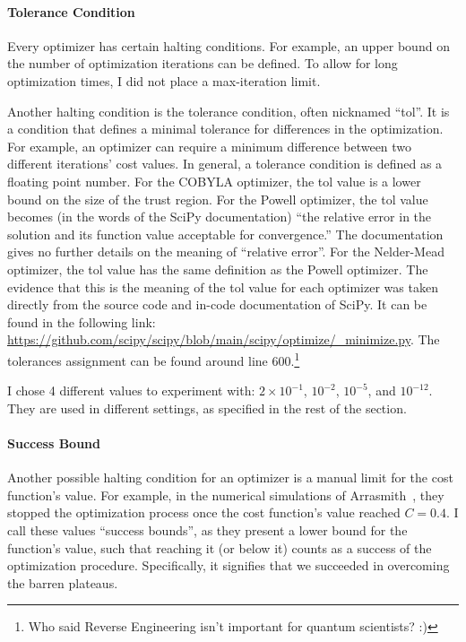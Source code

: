 \documentclass[a4paper,12pt]{article}
\newcommand{\e}[1]{ 10^{#1}}
\begin{document}
\paragraph*{Tolerance Condition}
Every optimizer has certain halting conditions.
For example, an upper bound on the number of optimization iterations can be defined.
To allow for long optimization times, I did not place a max-iteration limit.

Another halting condition is the tolerance condition, often nicknamed ``tol''.
It is a condition that defines a minimal tolerance for differences in the optimization.
For example, an optimizer can require a minimum difference between two different iterations' cost values.
In general, a tolerance condition is defined as a floating point number.
For the COBYLA optimizer, the tol value is a lower bound on the size of the trust region.
For the Powell optimizer, the tol value becomes (in the words of the SciPy documentation) ``the relative error in the solution and its function value acceptable for convergence.'' The documentation gives no further details on the meaning of ``relative error''.
For the Nelder-Mead optimizer, the tol value has the same definition as the Powell optimizer.
The evidence that this is the meaning of the tol value for each optimizer was taken directly from the source code and in-code documentation of SciPy.
It can be found in the following link: \url{https://github.com/scipy/scipy/blob/main/scipy/optimize/_minimize.py}. The tolerances assignment can be found around line 600.\footnote{Who said Reverse Engineering isn't important for quantum scientists? :)}

I chose 4 different values to experiment with: $2 \times \e{-1}$, $\e{-2}$, $\e{-5}$, and $\e{-12}$. They are used in different settings, as specified in the rest of the section.

\paragraph*{Success Bound}
Another possible halting condition for an optimizer is a manual limit for the cost function's value.
For example, in the numerical simulations of Arrasmith~\cite{arrasmith_effect_2021}, they stopped the optimization process once the cost function's value reached $C=0.4$.
I call these values ``success bounds'', as they present a lower bound for the function's value, such that reaching it (or below it) counts as a success of the optimization procedure. Specifically, it signifies that we succeeded in overcoming the barren plateaus.
\end{document}
